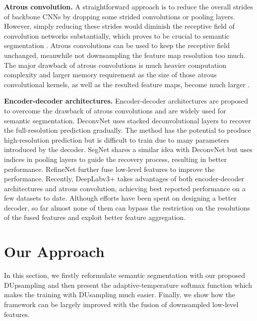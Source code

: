 \documentclass[10pt,twocolumn,letterpaper]{article}
\newcommand{\1}{{\mathbbm{1}}}
\begin{document}
\textbf{Atrous convolution.} A straightforward approach
is to reduce the overall strides of backbone CNNs by dropping some strided  convolutions or pooling layers.  However, simply reducing these strides would diminish the receptive field of convolution networks substantially, which proves to be crucial to semantic segmentation \cite{chen2018deeplab, peng2017large, liu2015parsenet}.
Atrous convolutions   \cite{chen2017rethinking, chen2018deeplab, chen2018encoder, yu2015multi} can be used to keep the receptive field unchanged, meanwhile not downsampling the feature map resolution too much.
The major drawback of atrous convolutions is much heavier computation complexity and larger memory requirement as the size of those atrous convolutional kernels, as well as the resulted feature maps, become much larger
 \cite{he2016deep, chollet2017xception}.



\textbf{Encoder-decoder architectures.} Encoder-decoder architectures are proposed to overcome the drawback of atrous convolutions and are widely used  for semantic segmentation. DeconvNet \cite{noh2015learning}  uses stacked deconvolutional layers to recover the full-resolution prediction gradually. The method has the potential to produce high-resolution prediction but is difficult to train
due to many parameters introduced by the decoder. SegNet \cite{badrinarayanan2017segnet} shares a similar idea with DeconvNet but uses indices in pooling layers to guide the recovery process,  resulting in better performance. RefineNet \cite{lin2017refinenet}
further fuse low-level features to improve the performance. Recently, DeepLabv3+ \cite{chen2018encoder} takes advantages of both encoder-decoder architectures and atrous convolution, achieving best reported performance on a few datasets to date. Although efforts have been spent on designing a better decoder, so far almost none of them can bypass the restriction on the resolutions of the fused features and exploit better feature aggregation.






\section{Our Approach}

In this section, we firstly reformulate semantic segmentation with our proposed DUpsampling and then present the adaptive-temperature softmax function
which makes the training with DUsampling much easier.
Finally, we show how the framework can be largely improved with the fusion of downsampled low-level features.
\end{document}
